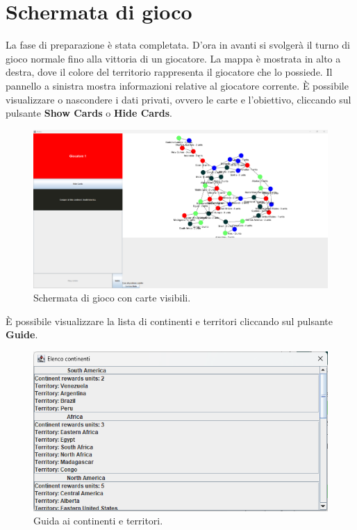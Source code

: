 \documentclass[a4paper,12pt]{report}
\begin{document}
\section{Schermata di gioco}
La fase di preparazione è stata completata. D'ora in avanti si svolgerà il turno di gioco normale fino alla vittoria di un giocatore.
La mappa è mostrata in alto a destra, dove il colore del territorio rappresenta il giocatore che lo possiede.
Il pannello a sinistra mostra informazioni relative al giocatore corrente.
È possibile visualizzare o nascondere i dati privati, ovvero le carte e l'obiettivo, cliccando sul pulsante \textbf{Show Cards} o \textbf{Hide Cards}.
\begin{figure}[H]
	\centering
	\includegraphics[width=1\textwidth]{user_guide/5_game_screen_show.png}
	\caption{Schermata di gioco con carte visibili.}
\end{figure}
È possibile visualizzare la lista di continenti e territori cliccando sul pulsante \textbf{Guide}.
\begin{figure}[H]
	\centering
	\includegraphics[width=1\textwidth]{user_guide/6_continent_list.png}
	\caption{Guida ai continenti e territori.}
\end{figure}
\end{document}
